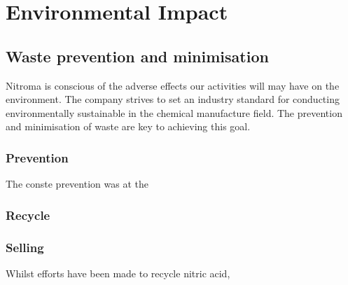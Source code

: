 \section{Environmental Impact}

\subsection{Waste prevention and minimisation }

Nitroma is conscious of the adverse effects our activities will may have on the environment. The company strives to set an industry standard for conducting environmentally sustainable in the chemical manufacture field. The prevention and minimisation of waste are key to achieving this goal. 

\subsubsection{Prevention}

The conste prevention was at the 


\subsubsection{Recycle}





\subsubsection{Selling}

Whilst efforts have been made to recycle nitric acid, 